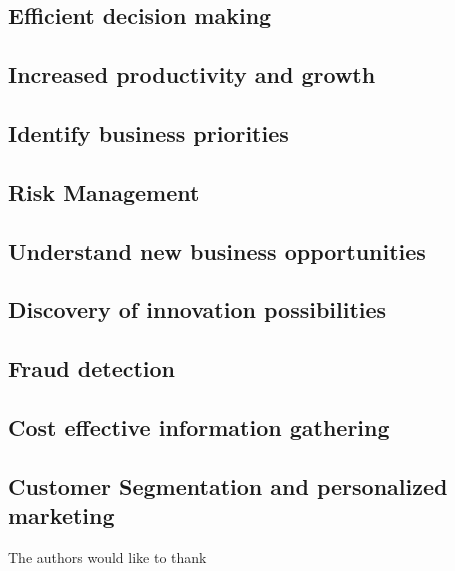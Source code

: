 \documentclass[sigconf]{acmart}
\begin{document}
\subsection{Efficient decision making}

\subsection{Increased productivity and growth}

\subsection{Identify business priorities}

\subsection{Risk Management}

\subsection{Understand new business opportunities}

\subsection{Discovery of innovation possibilities}

\subsection{Fraud detection}

\subsection{Cost effective information gathering}

\subsection{Customer Segmentation and personalized marketing}



\begin{acks}

  The authors would like to thank 

\end{acks}


 
\end{document}
